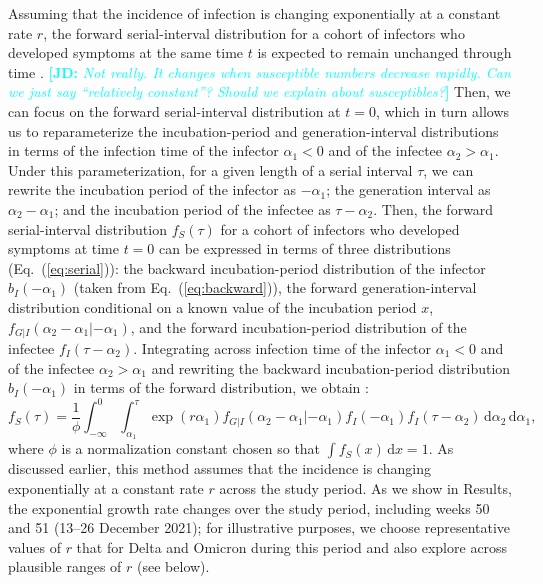 \documentclass[12pt]{article}
\newcommand{\comment}{\showcomment}
\newcommand{\showcomment}[3]{\textcolor{#1}{\textbf{[#2: }\textsl{#3}\textbf{]}}}
\newcommand{\jd}[1]{\comment{cyan}{JD}{#1}}
\newcommand{\eref}[1]{Eq.~(\ref{eq:#1})}
\newcommand{\dd}[1]{\ensuremath{\, \mathrm{d}#1}}
\newcommand{\dx}{\dd{x}}
\begin{document}
Assuming that the incidence of infection is changing exponentially at a constant rate $r$, the forward serial-interval distribution for a cohort of infectors who developed symptoms at the same time $t$ is expected to remain unchanged through time \citep{park2021forward}. 
\jd{Not really. It changes when susceptible numbers decrease rapidly. Can we just say ``relatively constant''? Should we explain about susceptibles?}
Then, we can focus on the forward serial-interval distribution at $t=0$, which in turn allows us to reparameterize the incubation-period and generation-interval distributions in terms of the infection time of the infector $\alpha_1 < 0$ and of the infectee $\alpha_2 > \alpha_1$. 
Under this parameterization, for a given length of a serial interval $\tau$, we can rewrite the incubation period of the infector as $-\alpha_1$; the generation interval as $\alpha_2 - \alpha_1$; and the incubation period of the infectee as $\tau - \alpha_2$.
Then, the forward serial-interval distribution $f_S(\tau)$ for a cohort of infectors who developed symptoms at time $t = 0$ can be expressed in terms of three distributions (\eref{serial}): the backward incubation-period distribution of the infector $b_I(-\alpha_1)$ (taken from \eref{backward}), the forward generation-interval distribution conditional on a known value of the incubation period $x$, $f_{G|I}(\alpha_2-\alpha_1|-\alpha_1)$, and the forward incubation-period distribution of the infectee $f_I(\tau - \alpha_2)$.
Integrating across infection time of the infector $\alpha_1 < 0$ and of the infectee $\alpha_2 > \alpha_1$ and rewriting the backward incubation-period distribution $b_I(-\alpha_1)$ in terms of the forward distribution, we obtain \citep{park2021forward}:
\begin{equation}
f_S(\tau) = \frac{1}{\phi} \int_{-\infty}^0\int_{\alpha_1}^\tau \exp(r \alpha_1) f_{G|I}(\alpha_2 - \alpha_1|- \alpha_1) f_I(- \alpha_1) f_I(\tau - \alpha_2) \dd \alpha_2 \dd \alpha_1,
\label{eq:forwardserial}
\end{equation}
where $\phi$ is a normalization constant chosen so that $\int f_S(x) \dx = 1$.
As discussed earlier, this method assumes that the incidence is changing exponentially at a constant rate $r$ across the study period.
As we show in Results, the exponential growth rate changes over the study period, including weeks 50 and 51 (13--26 December 2021);
for illustrative purposes, we choose representative values of $r$ that for Delta and Omicron during this period and also explore across plausible ranges of $r$ (see below).
\end{document}
